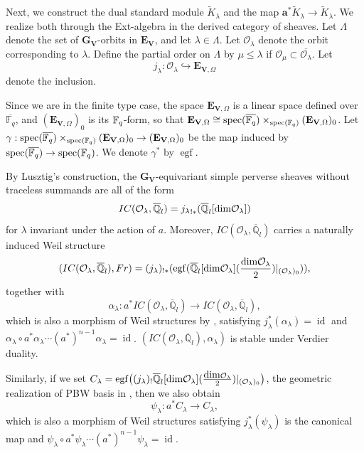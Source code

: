 \documentclass[10pt,a4paper]{amsart}
\def\dim{\mbox{\rm dim}}   \def\End{\mbox{\rm End}}
\newcommand\mo{{\mathcal{O}}}
\begin{document}
Next, we construct the dual standard module $\tilde{K}_{\lambda}$ and the map $\mathbf{a}^* \tilde{K}_{\lambda} \to \tilde{K}_{\lambda}$. We realize both through the Ext-algebra in the derived category of sheaves. Let $\Lambda$ denote the set of $\mathbf{G}_{\mathbf{V}}$-orbits in $\mathbf{E}_{\mathbf{V}}$, and let $\lambda \in \Lambda$. Let $\mathcal{O}_{\lambda}$ denote the orbit corresponding to $\lambda$. Define the partial order on $\Lambda$ by $\mu \leq \lambda$ if $\mathcal{O}_{\mu} \subset \overline{\mathcal{O}_{\lambda}}$. Let
\[
j_{\lambda} : \mathcal{O}_{\lambda} \hookrightarrow \mathbf{E}_{\mathbf{V},\Omega}
\]
denote the inclusion.

Since we are in the finite type case, the space $\mathbf{E}_{\mathbf{V},\Omega}$ is a linear space defined over $\overline{\mathbb{F}_{q}}$, and $(\mathbf{E}_{\mathbf{V},\Omega})_0$ is its ${\mathbb F}_q$-form, so that $\mathbf{E}_{\mathbf{V},\Omega}\cong \operatorname{spec}(\overline{\mathbb{F}_{q}})\times_{\operatorname{spec}({\mathbb F}_q)}(\mathbf{E}_{\mathbf{V},\Omega})_0$. Let $\gamma:\operatorname{spec}(\overline{\mathbb{F}_{q}})\times_{\operatorname{spec}({\mathbb F}_q)}(\mathbf{E}_{\mathbf{V},\Omega})_0\rightarrow (\mathbf{E}_{\mathbf{V},\Omega})_0$ be the map induced by $\operatorname{spec}(\overline{\mathbb{F}_{q}})\rightarrow \operatorname{spec}({\mathbb F}_q)$. We denote $\gamma^*$ by $\operatorname{egf}$.

By Lusztig's construction, the $\mathbf{G}_{\mathbf{V}}$-equivariant simple perverse sheaves without traceless summands are all of the form
\[
IC(\mathcal{O}_{\lambda}, \overline{\mathbb{Q}}_l)={j_{\lambda}}_{!*}(\overline{\mathbb{Q}}_l[\dim \mo_{\lambda}])
\]
for $\lambda$ invariant under the action of $a$. Moreover, $IC(\mathcal{O}_{\lambda}, \overline{\mathbb{Q}}_l)$ carries a naturally induced Weil structure
\[
(IC(\mathcal{O}_{\lambda}, \overline{\mathbb{Q}}_l), Fr)=(j_\lambda)_{!*}(\operatorname{egf}(\overline{\mathbb{Q}}_l[\dim \mo_{\lambda}](\frac{\dim\mo_{\lambda}}{2})|_{(\mo_{\lambda})_0})),
\]
together with
\[
\alpha_{\lambda} : a^* IC(\mathcal{O}_{\lambda}, \overline{\mathbb{Q}}_l) \to IC(\mathcal{O}_{\lambda}, \overline{\mathbb{Q}}_l),
\]
which is also a morphism of Weil structures by \cite{lusztig1998canonical}, satisfying $j_{\lambda}^*(\alpha_{\lambda})=\operatorname{id}$ and $\alpha_{\lambda}\circ a^*\alpha_{\lambda}\cdots (a^*)^{n-1}\alpha_{\lambda}=\operatorname{id}$. $(IC(\mathcal{O}_{\lambda}, \overline{\mathbb{Q}}_l),\alpha_{\lambda})$ is stable under Verdier duality.

Similarly, if we set $C_{\lambda}=\operatorname{egf}\bigl((j_{\lambda})_! \overline{\mathbb{Q}}_l[\dim \mo_{\lambda}](\frac{\dim\mo_{\lambda}}{2}) |_{(\mathcal{O}_{\lambda})_0}\bigr)$, the geometric realization of PBW basis in \cite{lan2025structurecoefficientsquantumgroups}, then we also obtain
\[
\psi_{\lambda} : a^* C_{\lambda} \to C_{\lambda},
\]
which is also a morphism of Weil structures satisfying $j_{\lambda}^*(\psi_{\lambda})$ is the canonical map and $\psi_{\lambda}\circ a^*\psi_{\lambda}\cdots (a^*)^{n-1}\psi_{\lambda}=\operatorname{id}$. 
\end{document}

